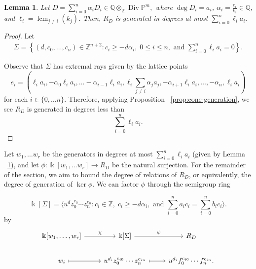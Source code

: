\documentclass{amsart}
\theoremstyle{plain}
\newtheorem{lem}[thm]{Lemma}
\theoremstyle{definition}
\theoremstyle{remark}
\numberwithin{equation}{section}
\newcommand\bq{{\mathbb Q}}
\newcommand\bp{{\mathbb P}}
\newcommand\bz{{\mathbb Z}}
\newcommand\bk{{\Bbbk}}
\DeclareMathOperator\di{Div}
\newcommand\bida{a}
\newcommand\bidb{b}
\DeclareMathOperator{\lcm}{lcm}
\begin{document}
\begin{lem} \label{lem:proj-generators}
Let $D = \sum_{i=0}^{n} \alpha_i D_i \in \bq \otimes_\bz \di \bp^m,$ where
$\deg D_i = \bida_i$, $\alpha_i = \frac{c_i}{k_i}\in \bq$, and
$\ell_i = \lcm_{j \neq i} (k_j)$. Then, $R_D$ is generated in degrees at most $\sum_{i=0}^n \ell_i \bida_i.$

\end{lem}
\begin{proof}
Let 
\begin{align}\label{eqn:Sigma-defn}
	\Sigma = \left \{(d, c_0, \ldots, c_n) \in \bz^{n+2} \colon c_i \geq - d
\alpha_i, \; 0 \leq i \leq n, \text{ and } \sum_{i=0}^{n} \ell_i \bida_i = 0
\right \}.
\end{align}

Observe that $\Sigma$ has extremal rays given by the lattice points 
\begin{equation}\label{eqn:e-i-proj}
	e_i = \left(\ell_i \bida_i, - \alpha_0 \ell_i \bida_i, \ldots
-\alpha_{i-1} \ell_i \bida_i, \ell_i \sum_{j\ne i} \alpha_j \bida_j,
-\alpha_{i+1} \ell_i \bida_i, \ldots, -\alpha_n, \ell_i \bida_i \right)
\end{equation}
for each $i\in \{0, \ldots n\}$.
Therefore, applying Proposition ~\ref{prop:cone-generation}, we see $R_D$ is generated in degrees less than
\[
	\sum_{i=0}^n \ell_i \bida_i.
\]
\end{proof}

Let $w_1, \ldots w_r$ be the generators in degrees at most $\sum_{i=0}^n \ell_i
\bida_i$ (given by Lemma ~\ref{lem:proj-generators}), and let 
$\phi \colon \bk[w_1, \ldots w_r] \to R_D$ be the natural surjection.
For the remainder of the section, we aim to bound the degree of relations
of $R_D$, or equivalently, the degree of generation of $\ker \phi$.
We can factor $\phi$ through the
semigroup ring 

\[
	\bk[\Sigma] =  \langle u^d z_0^{c_0} \cdots z_n^{c_n} \colon c_i \in
\bz, \; c_i \geq -d \alpha_i, \mbox{ and }\sum_{i=0}^{n} \bida_i c_i =
\sum_{i=0}^{n} \bidb_i c_i \rangle. 
\]
by
\begin{equation}
\label{eqn:factor-through-semigroup-ring}
\begin{tikzcd}[baseline=(current  bounding  box.center)]
\bk[w_1,\ldots, w_r] \ar {r}{\chi} & \bk[\Sigma] \ar {r}{\psi} & R_D \\
w_i \ar[mapsto]{r} & u^{d_i}z_0^{c_{i0}} \cdots z_n^{c_{in}} \ar[mapsto]{r} & u^{d_i}f_0^{c_{i0}} \cdots f_n^{c_{in}}.
\end{tikzcd}
\end{equation}
\end{document}
